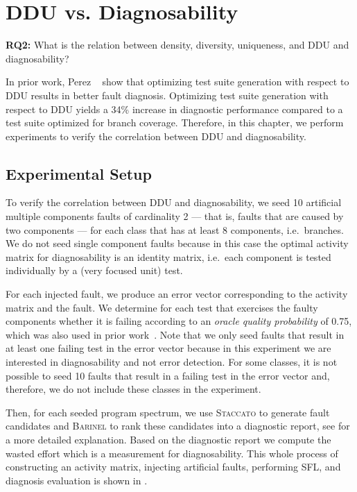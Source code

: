 \documentclass[twoside,a4paper,11pt]{memoir}
\begin{document}
\chapter{DDU vs. Diagnosability}%
\label{ch:rq2}
\begin{framed}
\noindent
\textbf{RQ2:} What is the relation between density, diversity, uniqueness, and DDU and diagnosability?
\end{framed}
In prior work, Perez \etal~\cite{DBLP:conf/icse/PerezAD17} show that optimizing test suite generation with respect to DDU results in better fault diagnosis.
Optimizing test suite generation with respect to DDU yields a 34\% increase in diagnostic performance compared to a test suite optimized for branch coverage.
Therefore, in this chapter, we perform experiments to verify the correlation between DDU and diagnosability.

\section{Experimental Setup}%
\label{sec:rq2_experimental_setup}
To verify the correlation between DDU and diagnosability, we seed 10 artificial multiple components faults of cardinality 2 --- that is, faults that are caused by two components --- for each class that has at least 8 components, i.e.\ branches.
We do not seed single component faults because in this case the optimal activity matrix for diagnosability is an identity matrix, i.e.\ each component is tested individually by a (very focused unit) test.

For each injected fault, we produce an error vector corresponding to the activity matrix and the fault.
We determine for each test that exercises the faulty components whether it is failing according to an \emph{oracle quality probability} of 0.75, which was also used in prior work~\cite{DBLP:conf/icse/PerezAD17}.
Note that we only seed faults that result in at least one failing test in the error vector because in this experiment we are interested in diagnosability and not error detection.
For some classes, it is not possible to seed 10 faults that result in a failing test in the error vector and, therefore, we do not include these classes in the experiment.

Then, for each seeded program spectrum, we use \textsc{Staccato} to generate fault candidates and \textsc{Barinel} to rank these candidates into a diagnostic report, see  for a more detailed explanation.
Based on the diagnostic report we compute the wasted effort which is a measurement for diagnosability.
This whole process of constructing an activity matrix, injecting artificial faults, performing SFL, and diagnosis evaluation is shown in .
\end{document}
